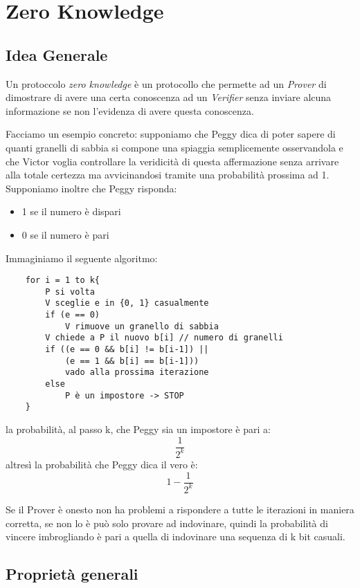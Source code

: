 \section{Zero Knowledge}

\subsection{Idea Generale}
Un protoccolo \emph{zero knowledge} è un protocollo che permette ad un \emph{Prover} di dimostrare di avere una certa conoscenza ad un \emph{Verifier} senza inviare alcuna informazione se non l'evidenza di avere questa conoscenza.

Facciamo un esempio concreto: supponiamo che Peggy dica di poter sapere di quanti granelli di sabbia si compone una spiaggia semplicemente osservandola e che Victor voglia controllare la veridicità di questa affermazione senza arrivare alla totale certezza ma avvicinandosi tramite una probabilità prossima ad 1. Supponiamo inoltre che Peggy risponda:

\begin{itemize}
    \item 1 se il numero è dispari
    \item 0 se il numero è pari
\end{itemize}

Immaginiamo il seguente algoritmo:

\begin{verbatim}
    for i = 1 to k{
        P si volta
        V sceglie e in {0, 1} casualmente
        if (e == 0)
            V rimuove un granello di sabbia
        V chiede a P il nuovo b[i] // numero di granelli
        if ((e == 0 && b[i] != b[i-1]) || 
            (e == 1 && b[i] == b[i-1]))
            vado alla prossima iterazione
        else
            P è un impostore -> STOP
    }
\end{verbatim}

la probabilità, al passo k, che Peggy sia un impostore è pari a:
$$
    \frac{1}{2^k}
$$
altresì la probabilità che Peggy dica il vero è:
$$
    1 - \frac{1}{2^k}
$$

Se il Prover è onesto non ha problemi a rispondere a tutte le iterazioni in maniera corretta, se non lo è può solo provare ad indovinare, quindi la probabilità di vincere imbrogliando è pari a quella di indovinare una sequenza di k bit casuali. 


\subsection{Proprietà generali}
